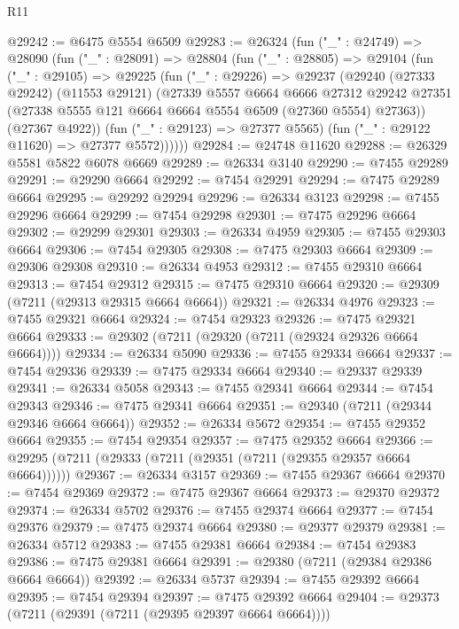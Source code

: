 \begin{lexlean}{R11}
\begin{coremodule}
@29242 := @6475 @5554 @6509
@29283 := @26324
    (fun ("_" : @24749) =>
    @28090
      (fun ("_" : @28091) =>
      @28804
        (fun ("_" : @28805) =>
        @29104
          (fun ("_" : @29105) =>
          @29225
            (fun ("_" : @29226) =>
            @29237
              (@29240
                (@27333 @29242)
                (@11553 @29121)
                (@27339
                  @5557
                  @6664
                  @6666
                  @27312
                  @29242
                  @27351
                  (@27338 @5555 @121 @6664 @6664 @5554 @6509 (@27360 @5554) @27363))
                (@27367 @4922))
              (fun ("_" : @29123) => @27377 @5565)
              (fun ("_" : @29122 @11620) => @27377 @5572))))))
@29284 := @24748 @11620
@29288 := @26329 @5581 @5822 @6078 @6669
@29289 := @26334 @3140
@29290 := @7455 @29289
@29291 := @29290 @6664
@29292 := @7454 @29291
@29294 := @7475 @29289 @6664
@29295 := @29292 @29294
@29296 := @26334 @3123
@29298 := @7455 @29296 @6664
@29299 := @7454 @29298
@29301 := @7475 @29296 @6664
@29302 := @29299 @29301
@29303 := @26334 @4959
@29305 := @7455 @29303 @6664
@29306 := @7454 @29305
@29308 := @7475 @29303 @6664
@29309 := @29306 @29308
@29310 := @26334 @4953
@29312 := @7455 @29310 @6664
@29313 := @7454 @29312
@29315 := @7475 @29310 @6664
@29320 := @29309 (@7211 (@29313 @29315 @6664 @6664))
@29321 := @26334 @4976
@29323 := @7455 @29321 @6664
@29324 := @7454 @29323
@29326 := @7475 @29321 @6664
@29333 := @29302 (@7211 (@29320 (@7211 (@29324 @29326 @6664 @6664))))
@29334 := @26334 @5090
@29336 := @7455 @29334 @6664
@29337 := @7454 @29336
@29339 := @7475 @29334 @6664
@29340 := @29337 @29339
@29341 := @26334 @5058
@29343 := @7455 @29341 @6664
@29344 := @7454 @29343
@29346 := @7475 @29341 @6664
@29351 := @29340 (@7211 (@29344 @29346 @6664 @6664))
@29352 := @26334 @5672
@29354 := @7455 @29352 @6664
@29355 := @7454 @29354
@29357 := @7475 @29352 @6664
@29366 := @29295 (@7211 (@29333 (@7211 (@29351 (@7211 (@29355 @29357 @6664 @6664))))))
@29367 := @26334 @3157
@29369 := @7455 @29367 @6664
@29370 := @7454 @29369
@29372 := @7475 @29367 @6664
@29373 := @29370 @29372
@29374 := @26334 @5702
@29376 := @7455 @29374 @6664
@29377 := @7454 @29376
@29379 := @7475 @29374 @6664
@29380 := @29377 @29379
@29381 := @26334 @5712
@29383 := @7455 @29381 @6664
@29384 := @7454 @29383
@29386 := @7475 @29381 @6664
@29391 := @29380 (@7211 (@29384 @29386 @6664 @6664))
@29392 := @26334 @5737
@29394 := @7455 @29392 @6664
@29395 := @7454 @29394
@29397 := @7475 @29392 @6664
@29404 := @29373 (@7211 (@29391 (@7211 (@29395 @29397 @6664 @6664))))

\end{coremodule}
\end{lexlean}
